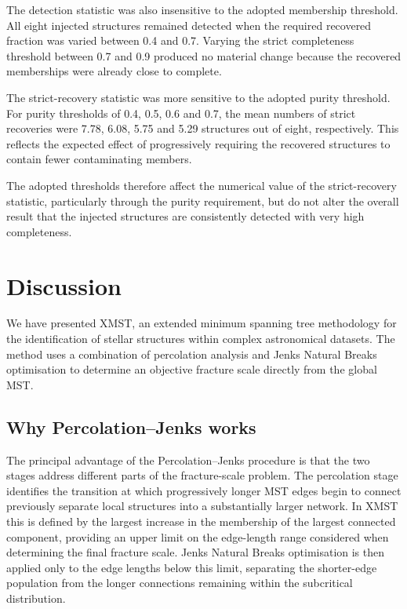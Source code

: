 \documentclass[fleqn,usenatbib]{mnras}
\begin{document}
The detection statistic was also insensitive to the adopted membership threshold. All eight injected structures remained detected when the required recovered fraction was varied between 0.4 and 0.7. Varying the strict completeness threshold between 0.7 and 0.9 produced no material change because the recovered memberships were already close to complete.

The strict-recovery statistic was more sensitive to the adopted purity threshold. For purity thresholds of 0.4, 0.5, 0.6 and 0.7, the mean numbers of strict recoveries were 7.78, 6.08, 5.75 and 5.29 structures out of eight, respectively. This reflects the expected effect of progressively requiring the recovered structures to contain fewer contaminating members.

The adopted thresholds therefore affect the numerical value of the strict-recovery statistic, particularly through the purity requirement, but do not alter the overall result that the injected structures are consistently detected with very high completeness.

\section{Discussion}
We have presented XMST, an extended minimum spanning tree methodology for the identification of stellar structures within complex astronomical datasets. The method uses a combination of percolation analysis and Jenks Natural Breaks optimisation to determine an objective fracture scale directly from the global MST.

\subsection{Why Percolation--Jenks works}

The principal advantage of the Percolation--Jenks procedure is that the two stages address different parts of the fracture-scale problem. The percolation stage identifies the transition at which progressively longer MST edges begin to connect previously separate local structures into a substantially larger network. In XMST this is defined by the largest increase in the membership of the largest connected component, providing an upper limit on the edge-length range considered when determining the final fracture scale. Jenks Natural Breaks optimisation is then applied only to the edge lengths below this limit, separating the shorter-edge population from the longer connections remaining within the subcritical distribution.
\end{document}

